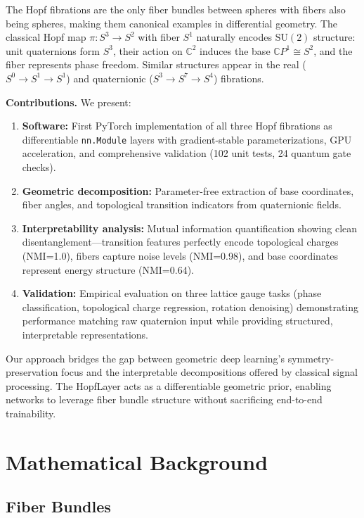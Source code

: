 \documentclass[10pt,twocolumn]{article}
\newcommand{\SU}{\mathrm{SU}}
\newcommand{\CC}{\mathbb{C}}
\begin{document}
The Hopf fibrations \citep{hopf1931abbildungen,adams1960hopf} are the only fiber bundles between spheres with fibers also being spheres, making them canonical examples in differential geometry. The classical Hopf map $\pi: S^3 \to S^2$ with fiber $S^1$ naturally encodes $\SU(2)$ structure: unit quaternions form $S^3$, their action on $\CC^2$ induces the base $\CC P^1 \cong S^2$, and the fiber represents phase freedom. Similar structures appear in the real ($S^0 \to S^1 \to S^1$) and quaternionic ($S^3 \to S^7 \to S^4$) fibrations.

\textbf{Contributions.} We present:
\begin{enumerate}
\item \textbf{Software:} First PyTorch implementation of all three Hopf fibrations as differentiable \texttt{nn.Module} layers with gradient-stable parameterizations, GPU acceleration, and comprehensive validation (102 unit tests, 24 quantum gate checks).
\item \textbf{Geometric decomposition:} Parameter-free extraction of base coordinates, fiber angles, and topological transition indicators from quaternionic fields.
\item \textbf{Interpretability analysis:} Mutual information quantification showing clean disentanglement---transition features perfectly encode topological charges (NMI=1.0), fibers capture noise levels (NMI=0.98), and base coordinates represent energy structure (NMI=0.64).
\item \textbf{Validation:} Empirical evaluation on three lattice gauge tasks (phase classification, topological charge regression, rotation denoising) demonstrating performance matching raw quaternion input while providing structured, interpretable representations.
\end{enumerate}

Our approach bridges the gap between geometric deep learning's symmetry-preservation focus and the interpretable decompositions offered by classical signal processing. The HopfLayer acts as a differentiable geometric prior, enabling networks to leverage fiber bundle structure without sacrificing end-to-end trainability.

\section{Mathematical Background}

\subsection{Fiber Bundles}
\end{document}
